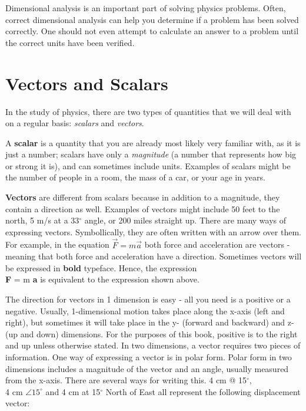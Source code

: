 	Dimensional analysis is an important part of solving physics problems.  Often, correct dimensional analysis can help you determine if a problem has been solved correctly.  One should not even attempt to calculate an answer to a problem until the correct units have been verified. 



		


\section{Vectors and Scalars}
In the study of physics, there are two types of quantities that we will deal with on a regular basis: \textit{scalars} and \textit{vectors}.  

A \textbf{scalar} is a quantity that you are already most likely very familiar with, as it is just a number; scalars have only a \textit{magnitude} (a number that represents how big or strong it is), and can sometimes include units.  Examples of scalars might be the number of people in a room, the mass of a car, or your age in years.  

\textbf{Vectors} are different from scalars because in addition to a magnitude, they contain a direction as well.  Examples of vectors might include 50 feet to the north, 5 m/s at a 33$^\circ$ angle, or 200 miles straight up.  
There are many ways of expressing vectors.  Symbollically, they are often written with an arrow over them.  For example, in the equation \color{blue} $\vec{F} = m \vec{a}$ \color{black}  both force and acceleration are vectors - meaning that both force and acceleration have a direction.  Sometimes vectors will be expressed in \textbf{bold} typeface.   Hence, the expression \\ \color{blue} \textbf{F} = m \textbf{a}  \color{black} is equivalent to the expression shown above.

The direction for vectors in 1 dimension is easy - all you need is a positive or a negative.  Usually, 1-dimensional motion takes place along the x-axis (left and right), but sometimes it will take place in the y- (forward and backward) and z- (up and down) dimensions.  For the purposes of this book, positive is to the right and up unless otherwise stated. 
In two dimensions, a vector requires two pieces of information.  One way of expressing a vector is in polar form.  Polar form in two dimensions includes a magnitude of the vector and an angle, usually measured from the x-axis.  There are several ways for writing this.  4 cm @ 15$^\circ$, \\ 4 cm $\angle 15^\circ$ and 4 cm at 15$^\circ$ North of East all represent the following displacement vector:



